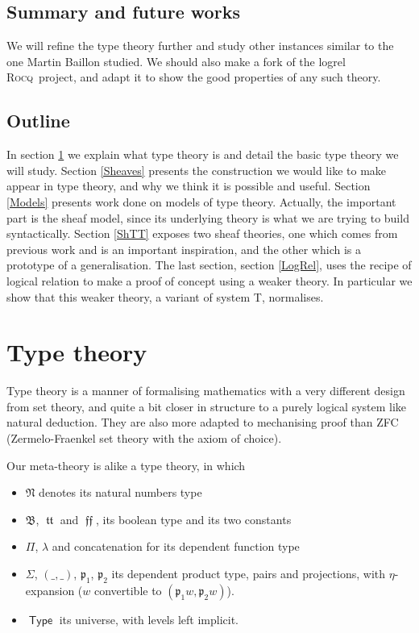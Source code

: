 \documentclass[11pt]{article}
\DeclareMathOperator{\Type}{\mathsf{Type}}
\DeclareMathOperator{\mtrue}{\mathfrak{tt}}
\DeclareMathOperator{\mfalse}{\mathfrak{ff}}
\newcommand{\0}{\mathbf{0}}
\newcommand{\1}{\mathbf{1}}
\newcommand{\mnat}{\mathfrak{N}}
\newcommand{\mbool}{\mathfrak{B}}
\newcommand{\rocq}{\textsc{Rocq}}
\begin{document}
\subsection*{Summary and future works}
We will refine the type theory further and study other instances similar to the one Martin Baillon studied.
We should also make a fork of the logrel \rocq\ project, and adapt it to show the good properties of any such theory.
\newpage
\tableofcontents
\newpage

\subsection*{Outline}

In section \ref{TT} we explain what type theory is and detail the basic type theory we will study. Section \ref{Sheaves} presents the construction we would like to make appear in type theory, and why we think it is possible and useful. Section \ref{Models} presents work done on models of type theory. Actually, the important part is the sheaf model, since its underlying theory is what we are trying to build syntactically. Section \ref{ShTT} exposes two sheaf theories, one which comes from previous work and is an important inspiration, and the other which is a prototype of a generalisation. The last section, section \ref{LogRel}, uses the recipe of logical relation to make a proof of concept using a weaker theory. In particular we show that this weaker theory, a variant of system T, normalises.

\section{Type theory}\label{TT}

Type theory is a manner of formalising mathematics with a very different design from set theory, and quite a bit closer in structure to a purely logical system like natural deduction. They are also more adapted to mechanising proof than ZFC (Zermelo-Fraenkel set theory with the axiom of choice).

Our meta-theory is alike a type theory, in which 
\begin{itemize}
    \item $\mnat$ denotes its natural numbers type
    \item $\mbool$, $\mtrue$ and $\mfalse$, its boolean type and its two constants
    \item $\Pi$, $\lambda$ and concatenation for its dependent function type
    \item $\Sigma$, $(\_,\_)$, $\mathfrak{p}_1$, $\mathfrak{p}_2$ its dependent product type, pairs and projections, with $\eta$-expansion ($w$ convertible to $(\mathfrak{p}_1 w, \mathfrak{p}_2 w)$).
    \item $\Type$ its universe, with levels left implicit.
\end{itemize}
\end{document}
